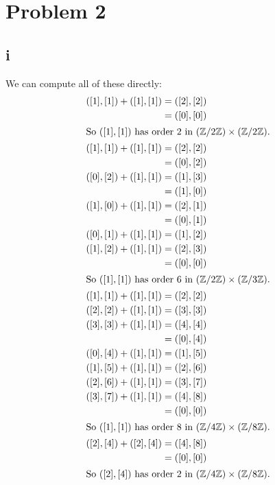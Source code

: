 \documentclass[12pt,letterpaper]{article}
\theoremstyle{definition}
\newcommand{\Z}{\mathbb{Z}}
\begin{document}
\section*{Problem 2}

\subsection*{i}

We can compute all of these directly:
\begin{align*}
  ([1],[1]) + ([1],[1]) &= ([2],[2]) \\
                        &= ([0],[0]) \\
  \intertext{So \(([1],[1])\) has order \(2\) in \((\Z/2\Z) \times (\Z/2\Z)\).}
  ([1],[1]) + ([1],[1]) &= ([2],[2]) \\
                        &= ([0],[2]) \\
  ([0],[2]) + ([1],[1]) &= ([1],[3]) \\
                        &= ([1],[0]) \\
  ([1],[0]) + ([1],[1]) &= ([2],[1]) \\
                        &= ([0],[1]) \\
  ([0],[1]) + ([1],[1]) &= ([1],[2]) \\
  ([1],[2]) + ([1],[1]) &= ([2],[3]) \\
                        &= ([0],[0]) \\
  \intertext{So \(([1],[1])\) has order \(6\) in \((\Z/2\Z) \times (\Z/3\Z)\).}
  ([1],[1]) + ([1],[1]) &= ([2],[2]) \\
  ([2],[2]) + ([1],[1]) &= ([3],[3]) \\
  ([3],[3]) + ([1],[1]) &= ([4],[4]) \\
                        &= ([0],[4]) \\
  ([0],[4]) + ([1],[1]) &= ([1],[5]) \\
  ([1],[5]) + ([1],[1]) &= ([2],[6]) \\
  ([2],[6]) + ([1],[1]) &= ([3],[7]) \\
  ([3],[7]) + ([1],[1]) &= ([4],[8]) \\
                        &= ([0],[0]) \\
  \intertext{So \(([1],[1])\) has order \(8\) in \((\Z/4\Z) \times (\Z/8\Z)\).}
  ([2],[4]) + ([2],[4]) &= ([4],[8]) \\
                        &= ([0],[0]) \\
  \intertext{So \(([2],[4])\) has order \(2\) in \((\Z/4\Z) \times (\Z/8\Z)\).}
\end{align*}
\end{document}
